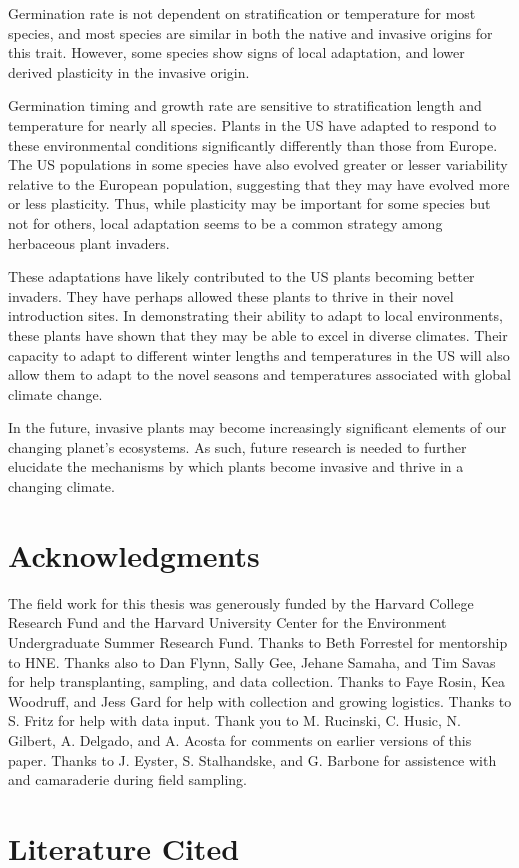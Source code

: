 \documentclass[12pt]{article}\usepackage[]{graphicx}\usepackage[]{color}
\begin{document}
	
	Germination rate is not dependent on stratification or temperature for most species, and most species are similar in both the native and invasive origins for this trait. However, some species show signs of local adaptation, and lower derived plasticity in the invasive origin. 
	
	Germination timing and growth rate are sensitive to stratification length and temperature for nearly all species. Plants in the US have adapted to respond to these environmental conditions significantly differently than those from Europe. The US populations in some species have also evolved greater or lesser variability relative to the European population, suggesting that they may have evolved more or less plasticity. Thus, while plasticity may be important for some species but not for others, local adaptation seems to be a common strategy among herbaceous plant invaders. 
	
	These adaptations have likely contributed to the US plants becoming better invaders. They have perhaps allowed these plants to thrive in their novel introduction sites. In demonstrating their ability to adapt to local environments, these plants have shown that they may be able to excel in diverse climates. Their capacity to adapt to different winter lengths and temperatures in the US will also allow them to adapt to the novel seasons and temperatures associated with global climate change.  
	
	In the future, invasive plants may become increasingly significant elements of our changing planet’s ecosystems. As such, future research is needed to further elucidate the mechanisms by which plants become invasive and thrive in a changing climate. 
	
	
	\section{Acknowledgments}
	 The field work for this thesis was generously funded by the Harvard College Research Fund and the Harvard University Center for the Environment Undergraduate Summer Research Fund. Thanks to Beth Forrestel for mentorship to HNE. Thanks also to Dan Flynn, Sally Gee, Jehane Samaha, and Tim Savas for help transplanting, sampling, and data collection. Thanks to Faye Rosin, Kea Woodruff, and Jess Gard for help with collection and growing logistics. Thanks to S. Fritz for help with data input. Thank you to M. Rucinski, C. Husic, N. Gilbert, A. Delgado, and A. Acosta for comments on earlier versions of this paper. Thanks to J. Eyster, S. Stalhandske, and G. Barbone for assistence with and camaraderie during field sampling. 

	

\section{Literature Cited}
\end{document}
